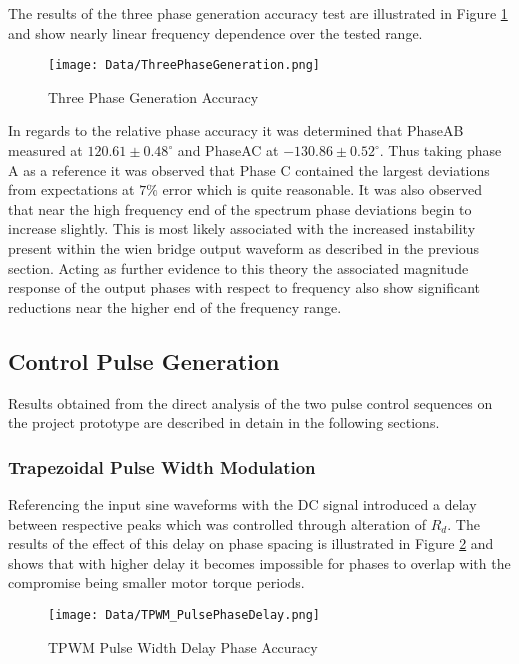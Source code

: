 \documentclass[12pt]{article}
\begin{document}
The results of the three phase generation accuracy test are illustrated in Figure \ref{ThreePhaseGenerationA} and show nearly linear frequency dependence over the tested range. 

\begin{figure}[H]
\centering
\caption{Three Phase Generation Accuracy}
\texttt{[image: Data/ThreePhaseGeneration.png]}
\label{ThreePhaseGenerationA}
\end{figure}

In regards to the relative phase accuracy it was determined that PhaseAB measured at $120.61\pm 0.48^{\circ}$ and PhaseAC at $-130.86\pm 0.52^{\circ}$. Thus taking phase A as a reference it was observed that Phase C contained the largest deviations from expectations at $7\%$ error which is quite reasonable. It was also observed that near the high frequency end of the spectrum phase deviations begin to increase slightly. This is most likely associated with the increased instability present within the wien bridge output waveform as described in the previous section. Acting as further evidence to this theory the associated magnitude response of the output phases with respect to frequency also show significant reductions near the higher end of the frequency range. 
\subsection{Control Pulse Generation}%

Results obtained from the direct analysis of the two pulse control sequences on the project prototype are described in detain in the following sections.

\subsubsection{Trapezoidal Pulse Width Modulation}%

Referencing the input sine waveforms with the DC signal introduced a delay between respective peaks which was controlled through alteration of $R_d$. The results of the effect of this delay on phase spacing is illustrated in Figure \ref{PhaseDelay} and shows that with higher delay it becomes impossible for phases to overlap with the compromise being smaller motor torque periods.

\begin{figure}[H]
\centering
\caption{TPWM Pulse Width Delay Phase Accuracy}
\texttt{[image: Data/TPWM\_PulsePhaseDelay.png]}
\label{PhaseDelay}
\end{figure}
\end{document}
